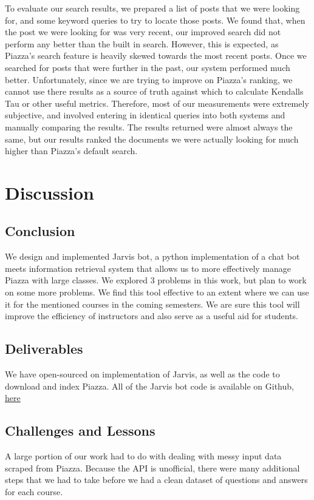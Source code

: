 \documentclass[sigconf]{acmart}
\begin{document}
To evaluate our search results, we prepared a list of posts that we were looking for, and some keyword queries to try to locate those posts. We found that, when the post we were looking for was very recent, our improved search did not perform any better than the built in search. However, this is expected, as Piazza's search feature is heavily skewed towards the most recent posts. Once we searched for posts that were further in the past, our system performed much better. Unfortunately, since we are trying to improve on Piazza's ranking, we cannot use there results as a source of truth against which to calculate Kendalls Tau or other useful metrics. Therefore, most of our measurements were extremely subjective, and involved entering in identical queries into both systems and manually comparing the results. The results returned were almost always the same, but our results ranked the documents we were actually looking for much higher than Piazza's default search.

\section{Discussion}

\subsection{Conclusion}
We design and implemented Jarvis bot, a python implementation of a chat bot meets information retrieval system that allows us to more effectively manage Piazza with large classes. We explored 3 problems in this work, but plan to work on some more problems. We find this tool effective to an extent where we can use it for the mentioned courses in the coming semesters. We are sure this tool will improve the efficiency of instructors and also serve as a useful aid for students.

\subsection{Deliverables}
We have open-sourced on implementation of Jarvis, as well as the code to download and index Piazza. All of the Jarvis bot code is available on Github, \href{https://github.com/pranavr93/piazza_bot}{here}

\subsection{Challenges and Lessons}
A large portion of our work had to do with dealing with messy input data scraped from Piazza. Because the API is unofficial, there were many additional steps that we had to take before we had a clean dataset of questions and answers for each course. 
\end{document}
